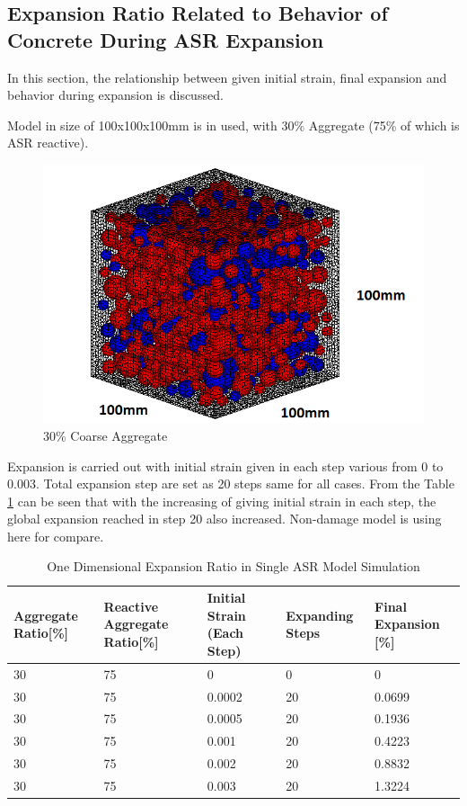 \clearpage
\subsection{Expansion Ratio Related to Behavior of Concrete During ASR Expansion}

In this section, the relationship between given initial strain, final expansion and behavior during expansion is discussed.

Model in size of 100x100x100mm is in used, with 30\% Aggregate (75\% of which is ASR reactive).

\begin{figure}[ht]
\centering
\includegraphics[width=.3\linewidth]{Files/Aggregate/A30P75.png}
  \caption{30\% Coarse Aggregate}
  \label{fig:A30_model}
\end{figure}

Expansion is carried out with initial strain given in each step various from 0 to 0.003. Total expansion step are set as 20 steps same for all cases. From the Table \ref{table:ASR_30_EXP} can be seen that with the increasing of giving initial strain in each step, the global expansion reached in step 20 also increased. Non-damage model is using here for compare.

\begin{table}[ht!]
\centering
\begin{tabular}{ ||p{2cm}|p{2cm}|p{2cm}|p{2cm}|p{2cm}|| }
 \hline
 Aggregate Ratio[\%] &  Reactive Aggregate Ratio[\%]  & Initial Strain (Each Step) & Expanding Steps & Final Expansion [\%] \\ [0.5ex]
 \hline\hline
 30 & 75 & 0 & 0 & 0\\
 30 & 75 & 0.0002 & 20 & 0.0699\\
 30 & 75 & 0.0005 & 20 & 0.1936\\
 30 & 75 & 0.001 & 20 & 0.4223\\
 30 & 75 & 0.002 & 20 & 0.8832\\
 30 & 75 & 0.003 & 20 & 1.3224\\
 \hline
\end{tabular}
\caption{One Dimensional Expansion Ratio in Single ASR Model Simulation}
\label{table:ASR_30_EXP}
\end{table}

